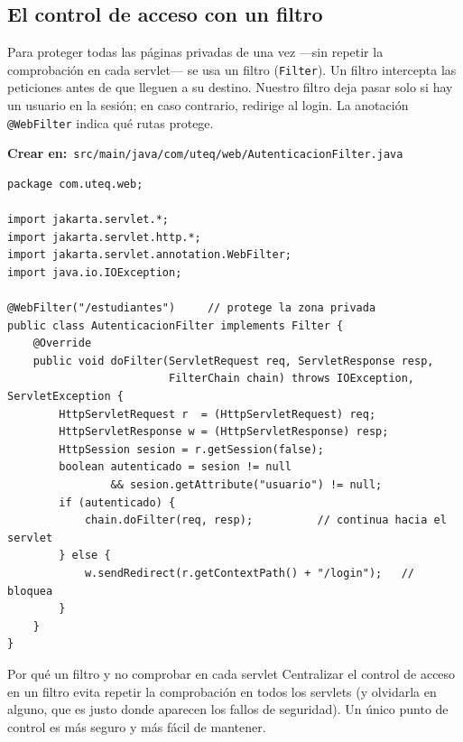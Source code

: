 \documentclass[11pt]{article}
\begin{document}
\subsection{El control de acceso con un filtro}
Para proteger todas las páginas privadas de una vez —sin repetir la comprobación en cada servlet— se usa un filtro (\texttt{Filter}). Un filtro intercepta las peticiones antes de que lleguen a su destino. Nuestro filtro deja pasar solo si hay un usuario en la sesión; en caso contrario, redirige al login. La anotación \texttt{@Web\allowbreak{}Filter} indica qué rutas protege.

{\small\color{jwebazulo}\textbf{Crear en:}~}\texttt{src/\allowbreak{}main/\allowbreak{}java/\allowbreak{}com/\allowbreak{}uteq/\allowbreak{}web/\allowbreak{}Autenticacion\allowbreak{}Filter.\allowbreak{}java}\par\nobreak\vspace{-1pt}
\begin{cajacodigo}
\begin{lstlisting}[style=java]
package com.uteq.web;

import jakarta.servlet.*;
import jakarta.servlet.http.*;
import jakarta.servlet.annotation.WebFilter;
import java.io.IOException;

@WebFilter("/estudiantes")     // protege la zona privada
public class AutenticacionFilter implements Filter {
    @Override
    public void doFilter(ServletRequest req, ServletResponse resp,
                         FilterChain chain) throws IOException, ServletException {
        HttpServletRequest r  = (HttpServletRequest) req;
        HttpServletResponse w = (HttpServletResponse) resp;
        HttpSession sesion = r.getSession(false);
        boolean autenticado = sesion != null
                && sesion.getAttribute("usuario") != null;
        if (autenticado) {
            chain.doFilter(req, resp);          // continua hacia el servlet
        } else {
            w.sendRedirect(r.getContextPath() + "/login");   // bloquea
        }
    }
}
\end{lstlisting}
\end{cajacodigo}
\vspace{2pt}
\begin{cajatip}{Por qué un filtro y no comprobar en cada servlet}
Centralizar el control de acceso en un filtro evita repetir la comprobación en todos los servlets (y olvidarla en alguno, que es justo donde aparecen los fallos de seguridad). Un único punto de control es más seguro y más fácil de mantener.\par
\end{cajatip}
\end{document}

